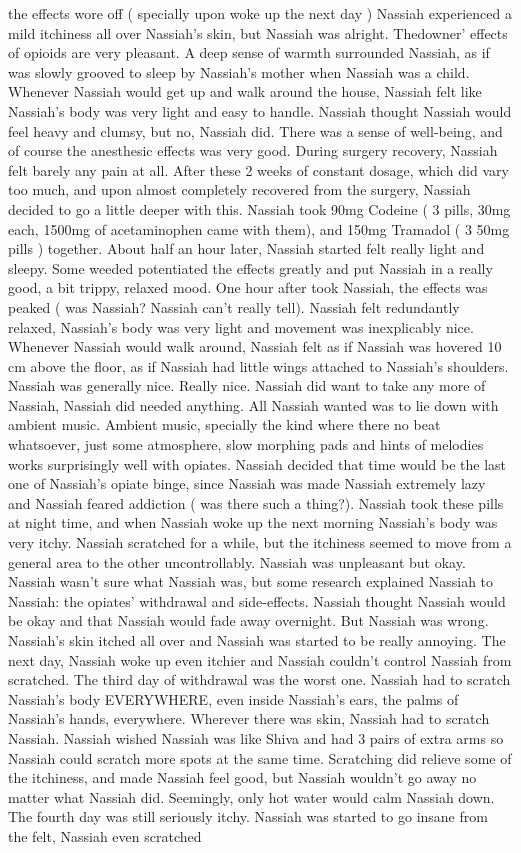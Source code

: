 \documentclass[12pt]{book}
\begin{document}
the effects wore off ( specially upon woke up the next day ) Nassiah experienced a mild itchiness all over Nassiah's skin, but Nassiah was alright. Thedowner' effects of opioids are very pleasant. A deep sense of warmth surrounded Nassiah, as if was slowly grooved to sleep by Nassiah's mother when Nassiah was a child. Whenever Nassiah would get up and walk around the house, Nassiah felt like Nassiah's body was very light and easy to handle. Nassiah thought Nassiah would feel heavy and clumsy, but no, Nassiah did. There was a sense of well-being, and of course the anesthesic effects was very good. During surgery recovery, Nassiah felt barely any pain at all. After these 2 weeks of constant dosage, which did vary too much, and upon almost completely recovered from the surgery, Nassiah decided to go a little deeper with this. Nassiah took 90mg Codeine ( 3 pills, 30mg each, 1500mg of acetaminophen came with them), and 150mg Tramadol ( 3 50mg pills ) together. About half an hour later, Nassiah started felt really light and sleepy. Some weeded potentiated the effects greatly and put Nassiah in a really good, a bit trippy, relaxed mood. One hour after took Nassiah, the effects was peaked ( was Nassiah? Nassiah can't really tell). Nassiah felt redundantly relaxed, Nassiah's body was very light and movement was inexplicably nice. Whenever Nassiah would walk around, Nassiah felt as if Nassiah was hovered 10 cm above the floor, as if Nassiah had little wings attached to Nassiah's shoulders. Nassiah was generally nice. Really nice. Nassiah did want to take any more of Nassiah, Nassiah did needed anything. All Nassiah wanted was to lie down with ambient music. Ambient music, specially the kind where there no beat whatsoever, just some atmosphere, slow morphing pads and hints of melodies works surprisingly well with opiates. Nassiah decided that time would be the last one of Nassiah's opiate binge, since Nassiah was made Nassiah extremely lazy and Nassiah feared addiction ( was there such a thing?). Nassiah took these pills at night time, and when Nassiah woke up the next morning Nassiah's body was very itchy. Nassiah scratched for a while, but the itchiness seemed to move from a general area to the other uncontrollably. Nassiah was unpleasant but okay. Nassiah wasn't sure what Nassiah was, but some research explained Nassiah to Nassiah: the opiates' withdrawal and side-effects. Nassiah thought Nassiah would be okay and that Nassiah would fade away overnight. But Nassiah was wrong. Nassiah's skin itched all over and Nassiah was started to be really annoying. The next day, Nassiah woke up even itchier and Nassiah couldn't control Nassiah from scratched. The third day of withdrawal was the worst one. Nassiah had to scratch Nassiah's body EVERYWHERE, even inside Nassiah's ears, the palms of Nassiah's hands, everywhere. Wherever there was skin, Nassiah had to scratch Nassiah. Nassiah wished Nassiah was like Shiva and had 3 pairs of extra arms so Nassiah could scratch more spots at the same time. Scratching did relieve some of the itchiness, and made Nassiah feel good, but Nassiah wouldn't go away no matter what Nassiah did. Seemingly, only hot water would calm Nassiah down. The fourth day was still seriously itchy. Nassiah was started to go insane from the felt, Nassiah even scratched 
\end{document}
